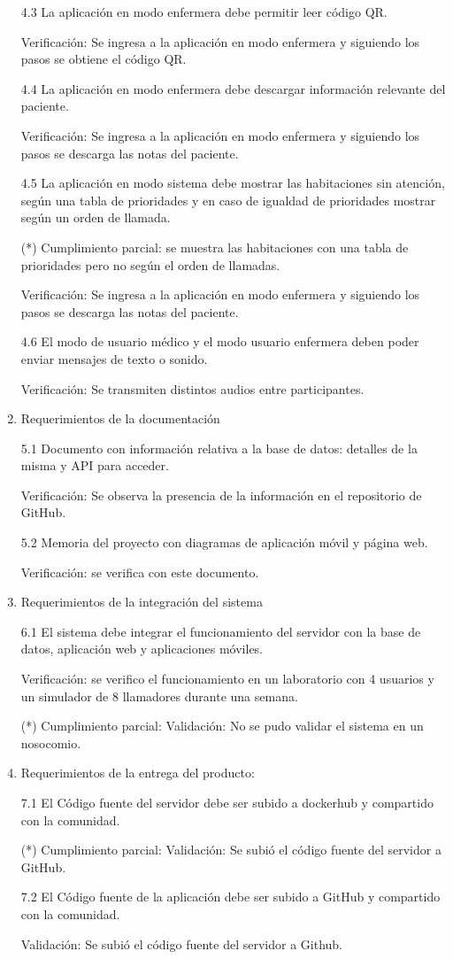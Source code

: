 \begin{enumerate}
4.3 La aplicación en modo enfermera debe permitir leer código QR.

Verificación: Se ingresa a la aplicación en modo enfermera y siguiendo los pasos se obtiene el código QR.

4.4 La aplicación en modo enfermera debe descargar información relevante del paciente.

Verificación: Se ingresa a la aplicación en modo enfermera y siguiendo los pasos se descarga las notas del paciente.

4.5 La aplicación en modo sistema debe mostrar las habitaciones sin atención, según una tabla de prioridades y en caso de igualdad de prioridades mostrar según un orden de llamada.

(*) Cumplimiento parcial: se muestra las habitaciones con una tabla de prioridades pero no según el orden de llamadas.

Verificación: Se ingresa a la aplicación en modo enfermera y siguiendo los pasos se descarga las notas del paciente.


4.6 El modo de usuario médico y el modo usuario enfermera deben poder enviar mensajes de texto o sonido.

Verificación: Se transmiten distintos audios entre participantes.

\item Requerimientos de la documentación

5.1 Documento con información relativa a la base de datos: detalles de la misma y API para acceder.

Verificación: Se observa la presencia de la información en el repositorio de GitHub.

5.2 Memoria del proyecto con diagramas de aplicación móvil y página web.

Verificación: se verifica con este documento.

\item Requerimientos de la integración del sistema

6.1 El sistema debe integrar el funcionamiento del servidor con la base de datos, aplicación web y aplicaciones móviles.

Verificación: se verifico el funcionamiento en un laboratorio con 4 usuarios y un simulador de 8 llamadores durante una semana.

(*) Cumplimiento parcial:
Validación: No se pudo validar el sistema en un nosocomio.

\item Requerimientos de la entrega del producto:

7.1 El Código fuente del servidor debe ser subido a dockerhub y compartido con la comunidad.

(*) Cumplimiento parcial:
Validación: Se subió el código fuente del servidor a GitHub.

7.2 El Código fuente de la aplicación debe ser subido a GitHub y compartido con la comunidad.

Validación: Se subió el código fuente del servidor a Github.

\end{enumerate}
